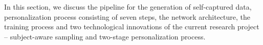 \documentclass[12pt,a4paper]{article}
\begin{document}






In this section, we discuss the pipeline for the generation of
self-captured data, personalization process consisting of seven
steps, the network architecture, the training process and two
technological innovations of the current research project --
subject-aware sampling and two-stage personalization process.
\end{document}
